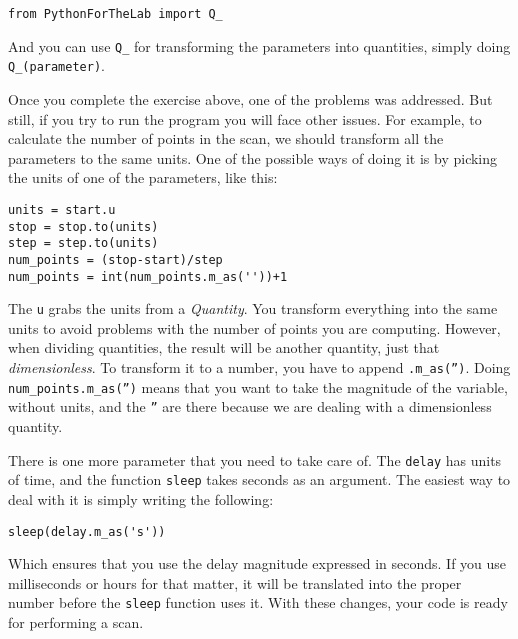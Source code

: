 \begin{verbatim}
from PythonForTheLab import Q_
\end{verbatim}

And you can use \texttt{Q_} for transforming the parameters into quantities, simply doing \texttt{Q_(parameter)}.


Once you complete the exercise above, one of the problems was addressed. But still, if you try to run the program you will face other issues. For example, to calculate the number of points in the scan, we should transform all the parameters to the same units. One of the possible ways of doing it is by picking the units of one of the parameters, like this:

\begin{verbatim}
units = start.u
stop = stop.to(units)
step = step.to(units)
num_points = (stop-start)/step
num_points = int(num_points.m_as(''))+1
\end{verbatim}

The \texttt{u} grabs the units from a \emph{Quantity}. You transform everything into the same units to avoid problems with the number of points you are computing. However, when dividing quantities, the result will be another quantity, just that \emph{dimensionless}. To transform it to a number, you have to append \texttt{.m_as('')}. Doing \texttt{num_points.m_as('')} means that you want to take the magnitude of the variable, without units, and the \texttt{''} are there because we are dealing with a dimensionless quantity. 


There is one more parameter that you need to take care of. The \texttt{delay} has units of time, and the function \texttt{sleep} takes seconds as an argument. The easiest way to deal with it is simply writing the following:

\begin{verbatim}
sleep(delay.m_as('s'))
\end{verbatim}

Which ensures that you use the delay magnitude expressed in seconds.  If you use milliseconds or hours for that matter, it will be translated into the proper number before the \texttt{sleep} function uses it. With these changes, your code is ready for performing a scan. 

